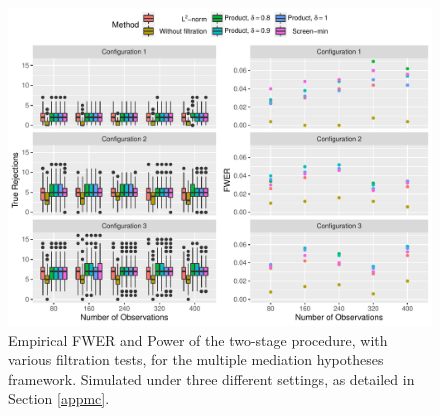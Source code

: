 \documentclass[ejs, twoside]{imsart}
\theoremstyle{plain}
\theoremstyle{remark}
\numberwithin{equation}{section}
\numberwithin{table}{section}
\numberwithin{figure}{section}
\begin{document}
%

\begin{figure}
	\centering
	\includegraphics[width=\textwidth]{pvals/pvals-all.pdf}
	\caption[Empirical FWER and power]{Empirical FWER and Power of the two-stage procedure, with various filtration tests, for the multiple mediation hypotheses framework. Simulated under three different settings, as detailed in Section \ref{appmc}.}
	\label{fig:simulatedfwerpower}
\end{figure}
\end{document}
